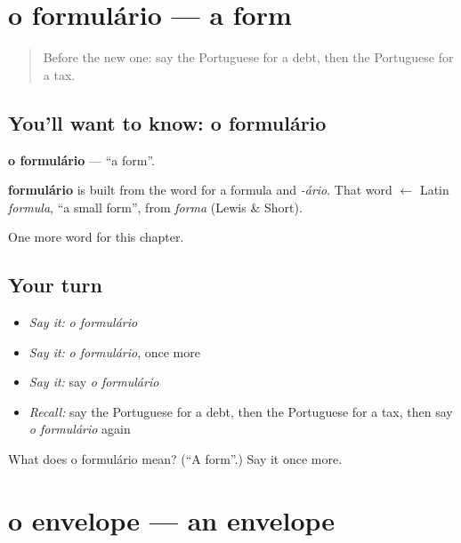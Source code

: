 \section[o formulário]{o formulário — a form}

\label{lesson:PT-C162-formulario}



\begin{quote}
Before the new one: say the Portuguese for a debt, then the Portuguese for a tax.
\end{quote}

\subsection*{You'll want to know: o formulário}
\textbf{o formulário} — \textquotedblleft{}a form\textquotedblright{}.

\begin{cousinweb}
\textbf{formulário} is built from the word for a formula and \emph{-ário}. That word $\leftarrow$ Latin \emph{formula}, \textquotedblleft{}a small form\textquotedblright{}, from \emph{forma} (Lewis \& Short).
\end{cousinweb}

\begin{grammarlens}[title={What you've built}]
One more word for this chapter.
\end{grammarlens}

\subsection*{Your turn}
\begin{itemize}
\raggedright
  \item \emph{Say it:} \emph{o formulário}
  \item \emph{Say it:} \emph{o formulário}, once more
  \item \emph{Say it:} say \emph{o formulário}
  \item \emph{Recall:} say the Portuguese for a debt, then the Portuguese for a tax, then say \emph{o formulário} again
\end{itemize}

\begin{tcolorbox}[breakable,colback=teal!4,colframe=teal!35!black,title={Before you move on}]
What does o formulário mean? (\textquotedblleft{}A form\textquotedblright{}.) Say it once more.
\end{tcolorbox}
\section[o envelope]{o envelope — an envelope}


